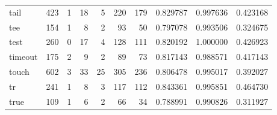 \begin{longtable}{lrrrrrrrrr}
tail      &                    423 &                                  1 &                                18 &                                5 &                               220 &                             179 &                                0.829787 &                               0.997636 &                             0.423168 \\
tee       &                    154 &                                  1 &                                 8 &                                2 &                                93 &                              50 &                                0.797078 &                               0.993506 &                             0.324675 \\
test      &                    260 &                                  0 &                                17 &                                4 &                               128 &                             111 &                                0.820192 &                               1.000000 &                             0.426923 \\
timeout   &                    175 &                                  2 &                                 9 &                                2 &                                89 &                              73 &                                0.817143 &                               0.988571 &                             0.417143 \\
touch     &                    602 &                                  3 &                                33 &                               25 &                               305 &                             236 &                                0.806478 &                               0.995017 &                             0.392027 \\
tr        &                    241 &                                  1 &                                 8 &                                3 &                               117 &                             112 &                                0.843361 &                               0.995851 &                             0.464730 \\
true      &                    109 &                                  1 &                                 6 &                                2 &                                66 &                              34 &                                0.788991 &                               0.990826 &                             0.311927 \\

\end{longtable}
